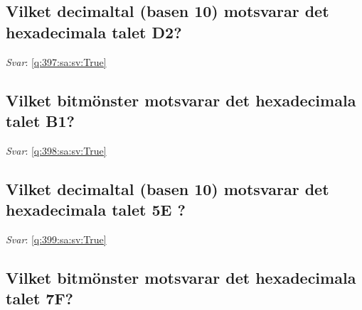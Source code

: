 \documentclass[a4paper,11pt,oneside]{article}
\begin{document}
\begin{sloppypar}
\subsection{Vilket decimaltal (basen 10) motsvarar det hexadecimala talet D2?}

\label{q:397:sa:sv:False}

\vspace{2cm}

\noindent\makebox[\textwidth]{\hrulefill}

\vspace{1cm}

\textit{Svar}: \autoref{q:397:sa:sv:True}



\subsection{Vilket bitm\"onster motsvarar det hexadecimala talet B1?}

\label{q:398:sa:sv:False}

\vspace{2cm}

\noindent\makebox[\textwidth]{\hrulefill}

\vspace{1cm}

\textit{Svar}: \autoref{q:398:sa:sv:True}



\subsection{Vilket decimaltal (basen 10) motsvarar det hexadecimala talet 5E ?}

\label{q:399:sa:sv:False}

\vspace{2cm}

\noindent\makebox[\textwidth]{\hrulefill}

\vspace{1cm}

\textit{Svar}: \autoref{q:399:sa:sv:True}



\subsection{Vilket bitm\"onster motsvarar det hexadecimala talet 7F?}

\label{q:400:sa:sv:False}

\vspace{2cm}


\end{sloppypar}
\end{document}
